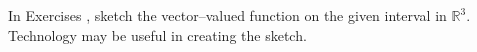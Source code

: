 {\noindent In Exercises}
{, sketch the vector--valued function on the given interval in $\mathbb{R}^3$. Technology may be useful in creating the sketch.
}
